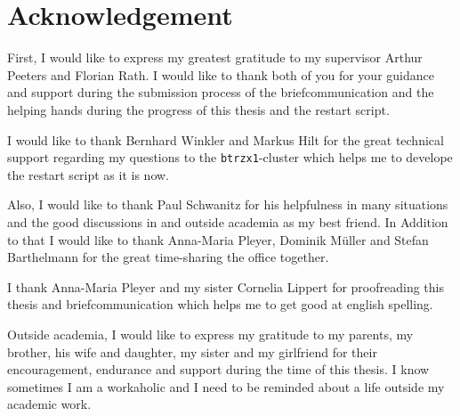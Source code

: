 \chapter*{Acknowledgement}
\label{chap:acknowledgement}

First, I would like to express my greatest gratitude to my supervisor Arthur Peeters and Florian Rath. I would like to thank both of you for your guidance and support during the submission process of the briefcommunication and the helping hands during the progress of this thesis and the restart script. \bigskip

I would like to thank Bernhard Winkler and Markus Hilt for the great technical support regarding my questions to the \texttt{btrzx1}-cluster which helps me to develope the restart script as it is now. \bigskip

Also, I would like to thank Paul Schwanitz for his helpfulness in many situations and the good discussions in and outside academia as my best friend. In Addition to that I would like to thank Anna-Maria Pleyer, Dominik Müller and Stefan Barthelmann for the great time-sharing the office together. \bigskip

I thank Anna-Maria Pleyer and my sister Cornelia Lippert for proofreading this thesis and briefcommunication which helps me to get good at english spelling. \bigskip

Outside academia, I would like to express my gratitude to my parents, my brother, his wife and daughter, my sister and my girlfriend for their encouragement, endurance and support during the time of this thesis. I know sometimes I am a workaholic and I need to be reminded about a life outside my academic work.